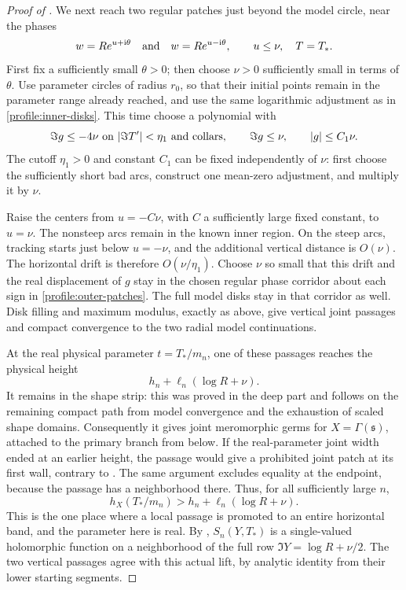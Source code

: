\begin{proof}[Proof of ]
We next reach two regular patches just beyond the model circle,
near the phases
\begin{equation}
 \label{profile:outer-patches}
 w=Re^{u+\mathrm i\theta}\quad\hbox{and}\quad
 w=Re^{u-\mathrm i\theta},\qquad u\le\nu,
 \quad T=T_*.
\end{equation}
First fix a sufficiently small \(\theta>0\); then choose
\(\nu>0\) sufficiently small in terms of \(\theta\). Use
parameter circles of radius \(r_0\), so that their initial points
remain in the parameter range already reached, and use the same
logarithmic adjustment as in \eqref{profile:inner-disks}. This time
choose a polynomial with
\[
 \Im g\le-4\nu\ \hbox{on }|\Im T'|<\eta_1
 \hbox{ and collars},\qquad
 \Im g\le\nu,\qquad |g|\le C_1\nu.
\]
The cutoff \(\eta_1>0\) and constant \(C_1\) can be fixed
independently of \(\nu\): first choose the sufficiently short bad
arcs, construct one mean-zero adjustment, and multiply it by
\(\nu\).

Raise the centers from \(u=-C\nu\), with \(C\) a sufficiently
large fixed constant, to \(u=\nu\). The nonsteep arcs remain in
the known inner region. On the steep arcs, tracking starts just
below \(u=-\nu\), and the additional vertical distance is
\(O(\nu)\). The horizontal drift is therefore
\(O(\nu/\eta_1)\). Choose \(\nu\) so small that this drift and
the real displacement of \(g\) stay in the chosen regular phase
corridor about each sign in \eqref{profile:outer-patches}. The full
model disks stay in that corridor as well. Disk filling and maximum
modulus, exactly as above, give vertical joint passages and compact
convergence to the two radial model continuations.

At the real physical parameter \(t=T_*/m_n\), one of these passages
reaches the physical height
\[
 h_n+\ell_n(\log R+\nu).
\]
It remains in the shape strip: this was proved in the deep part and
follows on the remaining compact path from model convergence and
the exhaustion of scaled shape domains. Consequently it gives
joint meromorphic germs for
\(X=\Gamma(\mathfrak s)\), attached to the primary branch from
below. If the real-parameter joint width ended at an earlier height,
the passage would give a prohibited joint patch at its first wall,
contrary to . The same argument excludes equality
at the endpoint, because the passage has a neighborhood there.
Thus, for all sufficiently large \(n\),
\begin{equation}
 \label{profile:real-width-passage}
 h_X(T_*/m_n)>h_n+\ell_n(\log R+\nu).
\end{equation}
This is the one place where a local passage is promoted to an entire
horizontal band, and the parameter here is real. By
, \(S_n(Y,T_*)\) is a single-valued
holomorphic function on a neighborhood of the full row
\(\Im Y=\log R+\nu/2\).
The two vertical passages agree with this actual lift, by analytic
identity from their lower starting segments.


\end{proof}
